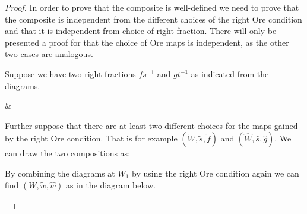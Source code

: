 \documentclass[12pt]{article}
\theoremstyle{definition}
\theoremstyle{remark}
\begin{document}
            \begin{proof}
                In order to prove that the composite is well-defined we need to prove that the composite is independent from the different choices of the right Ore condition and that it is independent from choice of right fraction. There will only be presented a proof for that the choice of Ore maps is independent, as the other two cases are analogous.

                Suppose we have two right fractions $fs^{-1}$ and $gt^{-1}$ as indicated from the diagrams.
                \begin{center}
                    \&
                \end{center}
                Further suppose that there are at least two different choices for the maps gained by the right Ore condition. That is for example $(\widetilde{W},\widetilde{s},\widetilde{f})$ and $(\widehat{W},\widehat{s}, \widehat{g})$. We can draw the two compositions as:
                \begin{center}
                \end{center}
                By combining the diagrams at $W_1$ by using the right Ore condition again we can find $(W, \widetilde{w}, \widehat{w})$ as in the diagram below. 
                \begin{center}
\end{center}
\end{proof}
\end{document}
